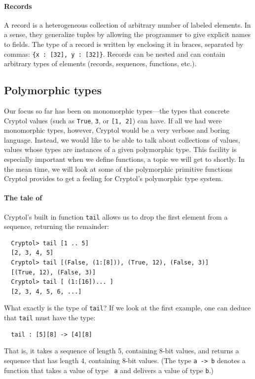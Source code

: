 \paragraph{Records}\indTheRecordType
A record is a heterogeneous collection of arbitrary number of labeled
elements.  In a sense, they generalize tuples by allowing the
programmer to give explicit names to fields. The type of a record is
written by enclosing it in braces, separated by commas:
\texttt{\{x :\ [32], y :\ [32]\}}. Records can be nested and can contain arbitrary
types of elements (records, sequences, functions, etc.).

\subsection{Polymorphic types}\indPolymorphism
\label{sec:polymorphic-types}

Our focus so far has been on monomorphic types---the types that
concrete Cryptol values (such as {\tt True}, {\tt 3}, or {\tt [1, 2]})
can have.  If all we had were monomorphic types, however, Cryptol
would be a very verbose and boring language.  Instead, we would like
to be able to talk about collections of values, values whose types are
instances of a given polymorphic type. This facility is especially
important when we define functions, a topic we will get to shortly. In
the mean time, we will look at some of the polymorphic primitive
functions Cryptol provides to get a feeling for Cryptol's polymorphic
type system.

\paragraph{The tale of {}}\indTail
Cryptol's built in function {\tt tail} allows us to drop the first
element from a sequence, returning the remainder:
\begin{Verbatim}
  Cryptol> tail [1 .. 5]
  [2, 3, 4, 5]
  Cryptol> tail [(False, (1:[8])), (True, 12), (False, 3)]
  [(True, 12), (False, 3)]
  Cryptol> tail [ (1:[16])... ]
  [2, 3, 4, 5, 6, ...]
\end{Verbatim}
What exactly is the type of {\tt tail}? If we look at the first
example, one can deduce that {\tt tail} must have the type:
\begin{Verbatim}
  tail : [5][8] -> [4][8]
\end{Verbatim}
That is, it takes a sequence of length 5, containing 8-bit values, and
returns a sequence that has length 4, containing 8-bit values. (The
type {\tt a -> b} denotes a function that takes a value of type {\tt
  a} and delivers a value of type {\tt b}.)

